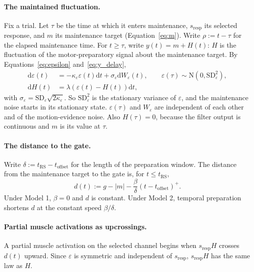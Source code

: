 \documentclass[a4paper,11pt]{article}
\theoremstyle{definition}
\newcommand{\dd}{\mathrm d}
\newcommand{\1}{\mathbbm{1}}
\begin{document}
\paragraph{The maintained fluctuation.} Fix a trial. Let $\tau$ be the time at which it enters maintenance, ${s}_{\mathrm{resp}}$ its selected response, and $m$ its maintenance target (Equation~\eqref{eq:m}). Write $\rho :=t-\tau $ for the elapsed maintenance time. For $t\ge \tau $, write $y\left(t\right)=m+H\left(t\right)$: $H$ is the fluctuation of the motor-preparatory signal about the maintenance target. By Equations~\eqref{eq:epsilon} and~\eqref{eq:y_delay},
\begin{equation}
\begin{aligned}
    \dd \varepsilon \left(t\right) &= -\kappa_{\varepsilon} \varepsilon \left(t\right) \dd t+{\sigma }_{\varepsilon } \dd {W}_{\varepsilon }\left(t\right), \qquad \varepsilon \left(\tau \right)\sim \mathrm{N}\left(0,{\mathrm{SD}}_{\varepsilon }^{2}\right),\\
    \dd H\left(t\right) &= \lambda \left(\varepsilon \left(t\right)-H\left(t\right)\right) \dd t,
\end{aligned}
\label{eq:H}
\end{equation}
with ${\sigma }_{\varepsilon }={\mathrm{SD}}_{\varepsilon }\sqrt{2\kappa_{\varepsilon} }$. So ${\mathrm{SD}}_{\varepsilon }^{2}$ is the stationary variance of $\varepsilon$, and the maintenance noise starts in its stationary state. $\varepsilon(\tau)$ and ${W}_{\varepsilon }$ are independent of each other and of the motion-evidence noise. Also $H\left(\tau \right)=0$, because the filter output is continuous and $m$ is its value at $\tau $.

\paragraph{The distance to the gate.} Write $\delta :={t}_{\mathrm{RS}}-{t}_{\mathrm{offset}}$ for the length of the preparation window. The distance from the maintenance target to the gate is, for $t\le t_{\mathrm{RS}}$,
\begin{equation}
d\left(t\right):=g-\left|m\right|-\frac{\beta }{\delta }{\left(t-{t}_{\mathrm{offset}}\right)}^{+}.
\label{eq:d}
\end{equation}
Under Model 1, $\beta =0$ and $d$ is constant. Under Model 2, temporal preparation shortens $d$ at the constant speed $\beta /\delta$.

\paragraph{Partial muscle activations as upcrossings.} A partial muscle activation on the selected channel begins when ${s}_{\mathrm{resp}}H$ crosses $d\left(t\right)$ upward. Since $\varepsilon$ is symmetric and independent of ${s}_{\mathrm{resp}}$, ${s}_{\mathrm{resp}}H$ has the same law as $H$.
\end{document}
